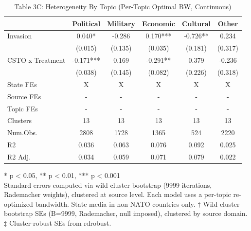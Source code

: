 \begin{table}[!t]
\caption{Table 3C: Heterogeneity By Topic (Per-Topic Optimal BW, Continuous)} 
\fontsize{12.0pt}{14.4pt}\selectfont
\begin{tabular*}{\linewidth}{@{\extracolsep{\fill}}lccccc}
\toprule
  & Political & Military & Economic & Cultural & Other \\ 
\midrule\addlinespace[2.5pt]
Invasion & 0.040* & -0.286 & 0.170*** & -0.726** & 0.234 \\ 
 & (0.015) & (0.135) & (0.035) & (0.181) & (0.317) \\ 
CSTO x Treatment & -0.171*** & 0.169 & -0.291** & 0.379 & -0.236 \\ 
{} & {(0.038)} & {(0.145)} & {(0.082)} & {(0.226)} & {(0.318)} \\ 
State FEs & X & X & X & X & X \\ 
Source FEs & - & - & - & - & - \\ 
Topic FEs & - & - & - & - & - \\ 
Clusters & 13 & 13 & 13 & 13 & 13 \\ 
Num.Obs. & 2808 & 1728 & 1365 & 524 & 2220 \\ 
R2 & 0.036 & 0.063 & 0.076 & 0.092 & 0.025 \\ 
R2 Adj. & 0.034 & 0.059 & 0.071 & 0.079 & 0.022 \\ 
\bottomrule
\end{tabular*}
\begin{minipage}{\linewidth}
* p < 0.05, ** p < 0.01, *** p < 0.001\\
Standard errors computed via wild cluster bootstrap (9999 iterations, Rademacher
weights), clustered at source level. Each model uses a per-topic re-optimized
bandwidth. State media in non-NATO countries only. † Wild cluster bootstrap SEs
(B=9999, Rademacher, null imposed), clustered by source domain. ‡ Cluster-robust
SEs from rdrobust.\\
\end{minipage}
\end{table}

